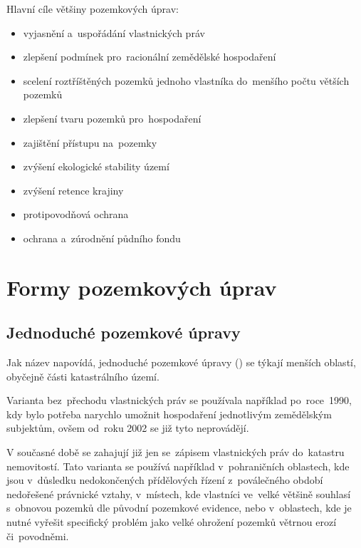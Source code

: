 Hlavní cíle většiny pozemkových úprav:
\vspace{-\topsep}
	\begin{itemize}[leftmargin=1.5cm, noitemsep]
		\item vyjasnění a~uspořádání vlastnických práv
		\item zlepšení podmínek pro~racionální zemědělské hospodaření
		\item scelení roztříštěných pozemků jednoho vlastníka do~menšího počtu větších pozemků
		\item zlepšení tvaru pozemků pro~hospodaření
		\item zajištění přístupu na~pozemky
		\item zvýšení ekologické stability území
		\item zvýšení retence krajiny
		\item protipovodňová ochrana
		\item ochrana a~zúrodnění půdního fondu
	\end{itemize}

\section{Formy pozemkových úprav}
\label{formy_pu}

\subsection{Jednoduché pozemkové úpravy}
\label{jednoduche_pu}

Jak název napovídá, jednoduché pozemkové úpravy () se týkají
menších oblastí, obyčejně části katastrálního území.

Varianta  bez~přechodu vlastnických práv se používala
například po~ro\-ce~1990, kdy bylo potřeba narychlo umožnit
hospodaření jednotlivým zemědělským subjektům, ovšem od~roku 2002 se
již tyto  neprovádějí.

V současné době se zahajují již jen  se~zápisem vlastnických
práv do~kata\-stru nemovitostí. Tato varianta  se používá
například v~pohraničních oblastech, kde jsou v~důsledku nedokončených
přídělových řízení z~poválečného období nedořešené právnické vztahy,
v~místech, kde vlastníci ve~velké většině souhlasí s~obnovou pozemků
dle původní pozemkové evidence, nebo v~oblastech, kde je nutné vyřešit
specifický problém jako velké ohrožení pozemků větrnou erozí
či~povodněmi.

